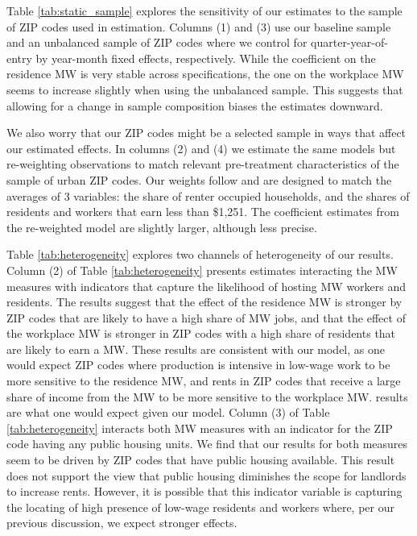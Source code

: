 Table \ref{tab:static_sample} explores the sensitivity of our estimates to 
the sample of ZIP codes used in estimation.
Columns (1) and (3) use our baseline sample and
an unbalanced sample of ZIP codes where we control for quarter-year-of-entry by
year-month fixed effects, respectively.
While the coefficient on the residence MW is very stable across specifications,
the one on the workplace MW seems to increase slightly when using the unbalanced
sample. This suggests that allowing for a change in sample composition biases
the estimates downward.

We also worry that our ZIP codes might be a selected sample in ways that affect
our estimated effects.
In columns (2) and (4) we estimate the same models but re-weighting 
observations to match relevant pre-treatment characteristics of the sample of 
urban ZIP codes.
Our weights follow \textcite{Hainmueller2012} and are designed to match the 
averages of 3 variables: 
the share of renter occupied households, and
the shares of residents and workers that earn less than \$1,251.
The coefficient estimates from the re-weighted model are slightly larger, 
although less precise.

Table \ref{tab:heterogeneity} explores two channels of heterogeneity of our 
results.
Column (2) of Table \ref{tab:heterogeneity} presents estimates interacting
the MW measures with indicators that capture the likelihood of hosting MW 
workers and residents.
The results suggest that the effect of the residence MW is stronger 
by ZIP codes that are likely to have a high share of MW jobs, and that 
the effect of the workplace MW is stronger in ZIP codes with a high share 
of residents that are likely to earn a MW.
These results are consistent with our model, as one would expect ZIP codes 
where production is intensive in low-wage work to be more sensitive to the 
residence MW, 
and rents in ZIP codes that receive a large share of income from the MW
to be more sensitive to the workplace MW.
results are what one would expect given our 
model.
Column (3) of Table \ref{tab:heterogeneity} interacts both MW measures with an
indicator for the ZIP code having any public housing units.
We find that our results for both measures seem to be driven by ZIP codes that 
have public housing available.
This result does not support the view that public housing diminishes the scope 
for landlords to increase rents.
However, it is possible that this indicator variable is capturing the locating 
of high presence of low-wage residents and workers where, per our previous
discussion, we expect stronger effects.

